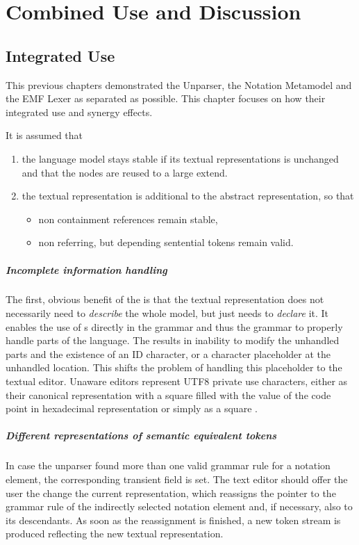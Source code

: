 \chapter{Combined Use and Discussion}

\section{Integrated Use}

This previous chapters  demonstrated the Unparser, the Notation Metamodel and the EMF Lexer as separated as possible. This chapter focuses on how their integrated use and synergy effects. 

It is assumed that 
\begin{enumerate}
	\item the language model stays stable if its textual representations is unchanged and that the nodes are reused to a large extend.
	\item the textual representation is additional to the abstract representation, so that 
	\begin{itemize}
		\item non containment references remain stable,
		\item non  referring, but  depending sentential tokens remain valid.
	\end{itemize}
\end{enumerate}


\paragraph{Incomplete information handling}
The first, obvious benefit of the  is that the textual representation does not necessarily need to \emph{describe} the whole model, but just needs to \emph{declare} it. It enables the use of s directly in the grammar and thus the grammar to properly handle parts of the language. The results in inability to modify the unhandled parts and the existence of an ID character, or a character placeholder at the unhandled location. This shifts the problem of handling this placeholder to the textual editor. Unaware editors represent UTF8 private use characters, either as their canonical representation with a square filled with the value of the code point in hexadecimal representation or simply as a square \code{$\square$}.

\paragraph{Different representations of semantic equivalent tokens}
In case the unparser found more than one valid grammar rule for a notation element, the corresponding transient field is set. The text editor should offer the user the change the current representation, which reassigns the pointer to the grammar rule of the indirectly selected notation element and, if necessary, also to its descendants. As soon as the reassignment is finished, a new token stream is produced reflecting the new textual representation.


